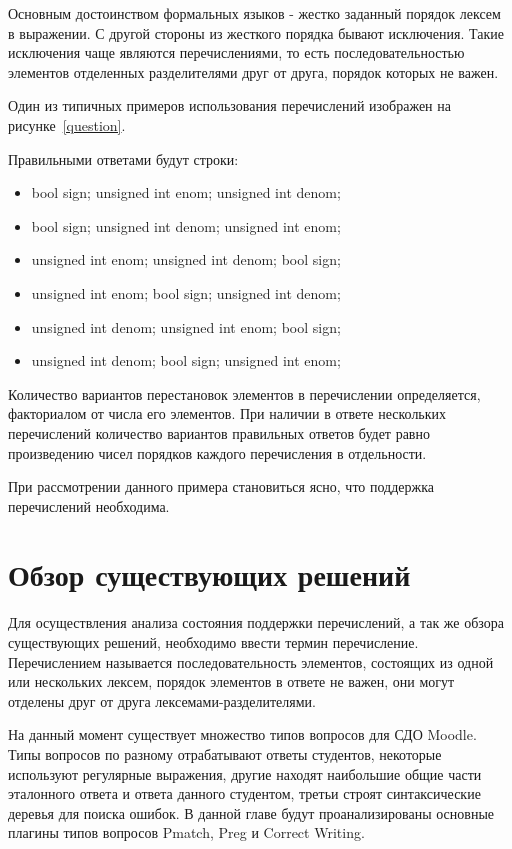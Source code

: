 \documentclass[a4paper,english,russian]{G2-105}
\begin{document}
\par Основным достоинством формальных языков - жестко заданный порядок лексем в выражении. С другой стороны из жесткого порядка бывают исключения. Такие исключения чаще являются перечислениями, то есть последовательностью элементов отделенных разделителями друг от друга, порядок которых не важен.
\par Один из типичных примеров использования перечислений изображен на рисунке~\ref{question}.

\par Правильными ответами будут строки:
\begin{itemize}
    \item bool sign; unsigned int enom; unsigned int denom;
    \item bool sign; unsigned int denom; unsigned int enom;
    \item unsigned int enom; unsigned int denom; bool sign;
    \item unsigned int enom; bool sign; unsigned int denom;
    \item unsigned int denom; unsigned int enom; bool sign;
    \item unsigned int denom; bool sign; unsigned int enom;
\end{itemize}
\par Количество вариантов перестановок элементов в перечислении определяется, факториалом от числа его элементов. При наличии в ответе нескольких перечислений количество вариантов правильных ответов будет равно произведению чисел порядков каждого перечисления в отдельности.
\par При рассмотрении данного примера становиться ясно, что поддержка перечислений необходима.
\section{Обзор существующих решений}

\par Для осуществления анализа состояния поддержки перечислений, а так же обзора существующих решений, необходимо ввести термин перечисление. Перечислением называется последовательность элементов, состоящих из одной или нескольких лексем, порядок элементов в ответе не важен, они могут отделены друг от друга лексемами-разделителями.
\par На данный момент существует множество типов вопросов для СДО Moodle. Типы вопросов по разному отрабатывают ответы студентов, некоторые используют регулярные выражения, другие находят наибольшие общие части эталонного ответа и ответа данного студентом, третьи строят синтаксические деревья для поиска ошибок. В данной главе будут проанализированы основные плагины типов вопросов Pmatch, Preg и Correct Writing.
\end{document}
